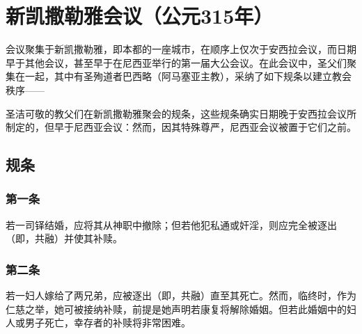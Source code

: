
\chapter{新凯撒勒雅会议（公元315年）}


会议聚集于新凯撒勒雅，即本都的一座城市，在顺序上仅次于安西拉会议，而日期早于其他会议，甚至早于在尼西亚举行的第一届大公会议。在此会议中，圣父们聚集在一起，其中有圣殉道者巴西略（阿马塞亚主教），采纳了如下规条以建立教会秩序——\par

圣洁可敬的教父们在新凯撒勒雅聚会的规条，这些规条确实日期晚于安西拉会议所制定的，但早于尼西亚会议：然而，因其特殊尊严，尼西亚会议被置于它们之前。\par


\section{规条}


\subsection{第一条}

若一司铎结婚，应将其从神职中撤除；但若他犯私通或奸淫，则应完全被逐出（即，共融）并使其补赎。\par


\subsection{第二条}

若一妇人嫁给了两兄弟，应被逐出（即，共融）直至其死亡。然而，临终时，作为仁慈之举，她可被接纳补赎，前提是她声明若康复将解除婚姻。但若此婚姻中的妇人或男子死亡，幸存者的补赎将非常困难。\par


